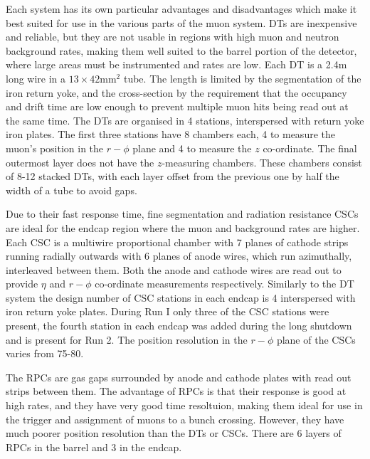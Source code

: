 Each system has its own particular advantages and disadvantages which make it best suited for use in the various parts of the muon system. \ac{DT}s are inexpensive and reliable, but they are not usable in regions with high muon and neutron background rates, making them well suited to the barrel portion of the detector, where large areas must be instrumented and rates are low. Each \ac{DT} is a 2.4m long wire in a $13\times 42$mm$^{2}$ tube. The length is limited by the segmentation of the iron return yoke, and the cross-section by the requirement that the occupancy and drift time are low enough to prevent multiple muon hits being read out at the same time. The \ac{DT}s are organised in 4 stations, interspersed with return yoke iron plates. The first three stations have 8 chambers each, 4 to measure the muon's position in the $r-\phi$ plane and 4 to measure the $z$ co-ordinate. The final outermost layer does not have the $z$-measuring chambers. These chambers consist of 8-12 stacked \ac{DT}s, with each layer offset from the previous one by half the width of a tube to avoid gaps.

Due to their fast response time, fine segmentation and radiation resistance \ac{CSC}s are ideal for the endcap region where the muon and background rates are higher. Each \ac{CSC} is a multiwire proportional chamber with 7 planes of cathode strips running radially outwards with 6 planes of anode wires, which run azimuthally, interleaved between them. Both the anode and cathode wires are read out to provide $\eta$ and $r-\phi$ co-ordinate measurements respectively. Similarly to the \ac{DT} system the design number of \ac{CSC} stations in each endcap is 4 interspersed with iron return yoke plates. During Run I only three of the \ac{CSC} stations were present, the fourth station in each endcap was added during the long shutdown and is present for Run 2. The position resolution in the $r-\phi$ plane of the \ac{CSC}s varies from 75-80\micron.

The \ac{RPC}s are gas gaps surrounded by anode and cathode plates with read out strips between them. The advantage of \ac{RPC}s is that their response is good at high rates, and they have very good time resoltuion, making them ideal for use in the trigger and assignment of muons to a bunch crossing. However, they have much poorer position resolution than the \ac{DT}s or \ac{CSC}s. There are 6 layers of \ac{RPC}s in the barrel and 3 in the endcap.

